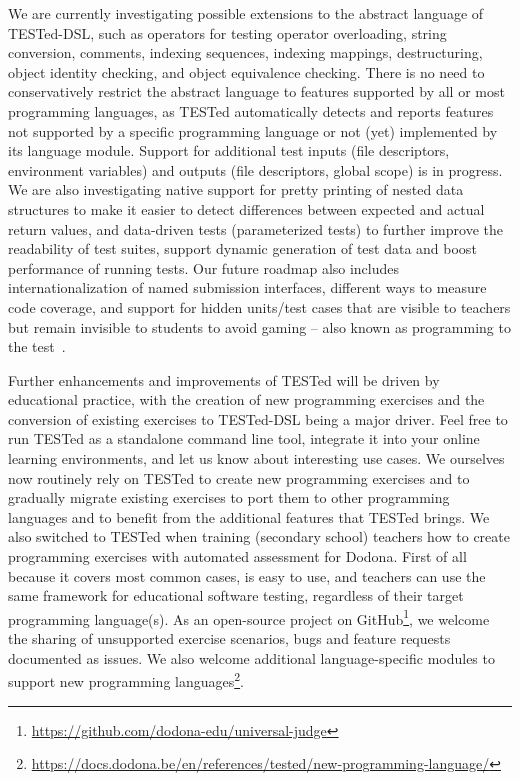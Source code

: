 \documentclass[../main]{subfiles}
\begin{document}
We are currently investigating possible extensions to the abstract language of TESTed-DSL, such as operators for testing operator overloading, string conversion, comments, indexing sequences, indexing mappings, destructuring, object identity checking, and object equivalence checking.
There is no need to conservatively restrict the abstract language to features supported by all or most programming languages, as TESTed automatically detects and reports features not supported by a specific programming language or not (yet) implemented by its language module.
Support for additional test inputs (file descriptors, environment variables) and outputs (file descriptors, global scope) is in progress.
We are also investigating native support for pretty printing of nested data structures to make it easier to detect differences between expected and actual return values, and data-driven tests (parameterized tests) to further improve the readability of test suites, support dynamic generation of test data and boost performance of running tests.
Our future roadmap also includes internationalization of named submission interfaces, different ways to measure code coverage, and support for hidden units/test cases that are visible to teachers but remain invisible to students to avoid gaming -- also known as programming to the test~\autocite{pevelerComparingJailedSandboxes2019}.

Further enhancements and improvements of TESTed will be driven by educational practice, with the creation of new programming exercises and the conversion of existing exercises to TESTed-DSL being a major driver.
Feel free to run TESTed as a standalone command line tool, integrate it into your online learning environments, and let us know about interesting use cases.
We ourselves now routinely rely on TESTed to create new programming exercises and to gradually migrate existing exercises to port them to other programming languages and to benefit from the additional features that TESTed brings.
We also switched to TESTed when training (secondary school) teachers how to create programming exercises with automated assessment for Dodona.
First of all because it covers most common cases, is easy to use, and teachers can use the same framework for educational software testing, regardless of their target programming language(s).
As an open-source project on GitHub\footnote{\url{https://github.com/dodona-edu/universal-judge}}, we welcome the sharing of unsupported exercise scenarios, bugs and feature requests documented as issues.
We also welcome additional language-specific modules to support new programming languages\footnote{\url{https://docs.dodona.be/en/references/tested/new-programming-language/}}.
\end{document}
